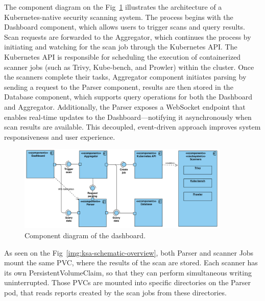 The component diagram on the Fig~\ref{img:ksa-component-diagram} illustrates the architecture of a Kubernetes-native security scanning system. The process begins with the Dashboard component, which allows users to trigger scans and query results. Scan requests are forwarded to the Aggregator, which continues the process by initiating and watching for the scan job through the Kubernetes API. The Kubernetes API is responsible for scheduling the execution of containerized scanner jobs (such as Trivy, Kube-bench, and Prowler) within the cluster. Once the scanners complete their tasks, Aggregator component initiates parsing by sending a request to the Parser component, results are then stored in the Database component, which supports query operations for both the Dashboard and Aggregator. Additionally, the Parser exposes a WebSocket endpoint that enables real-time updates to the Dashboard—notifying it asynchronously when scan results are available. This decoupled, event-driven approach improves system responsiveness and user experience.

\begin{figure}[!hbt]
	\begin{center}
		\includegraphics[width=0.9\textwidth]{images/ksa-component-diagram.png}
        \caption{Component diagram of the dashboard.}
		\label{img:ksa-component-diagram}
	\end{center}
\end{figure}

As seen on the Fig~\ref{img:ksa-schematic-overview}, both Parser and scanner Jobs mount the same PVC, where the results of the scan are stored. Each scanner has its own PersistentVolumeClaim, so that they can perform simultaneous writing uninterrupted. Those PVCs are mounted into specific directories on the Parser pod, that reads reports created by the scan jobs from these directories.


